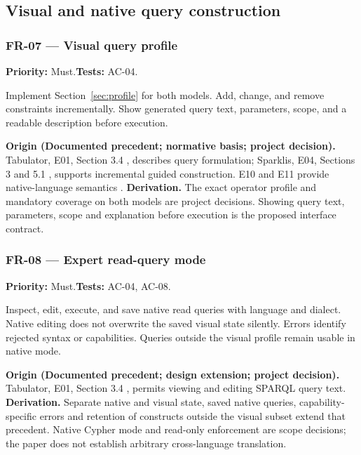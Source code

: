\documentclass[11pt,a4paper]{article}
\newcommand{\req}[4]{\subsubsection*{#1 --- #2}\phantomsection\label{req:#1}\textbf{Priority:} #3.\quad\textbf{Tests:} #4.\par}
\newcommand{\origin}[3]{\par{\small\textbf{Origin (#1).} #2 \textbf{Derivation.} #3\par}}
\begin{document}
\subsection{Visual and native query construction}
\par\noindent\begin{minipage}{\linewidth}
\req{FR-07}{Visual query profile}{Must}{AC-04}
Implement Section~\ref{sec:profile} for both models. Add, change, and remove constraints incrementally. Show generated query text, parameters, scope, and a readable description before execution.
\origin{Documented precedent; normative basis; project decision}{Tabulator, E01, Section 3.4 \citep{tabulator}, describes query formulation; Sparklis, E04, Sections 3 and 5.1 \citep{sparklis}, supports incremental guided construction. E10 and E11 provide native-language semantics \citep{sparql,opencypher}.}{The exact operator profile and mandatory coverage on both models are project decisions. Showing query text, parameters, scope and explanation before execution is the proposed interface contract.}
\end{minipage}\par
\par\noindent\begin{minipage}{\linewidth}
\req{FR-08}{Expert read-query mode}{Must}{AC-04, AC-08}
Inspect, edit, execute, and save native read queries with language and dialect. Native editing does not overwrite the saved visual state silently. Errors identify rejected syntax or capabilities. Queries outside the visual profile remain usable in native mode.
\origin{Documented precedent; design extension; project decision}{Tabulator, E01, Section 3.4 \citep{tabulator}, permits viewing and editing SPARQL query text.}{Separate native and visual state, saved native queries, capability-specific errors and retention of constructs outside the visual subset extend that precedent. Native Cypher mode and read-only enforcement are scope decisions; the paper does not establish arbitrary cross-language translation.}
\end{minipage}\par
\end{document}
